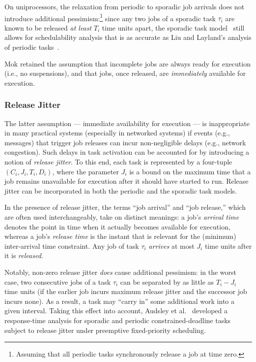 On uniprocessors, the relaxation from periodic to sporadic job arrivals does not introduce additional pessimism:\footnote{Assuming that all periodic tasks synchronously release a job at time zero.} since any two jobs of a sporadic task $\tau_i$ are  known to be released \emph{at least} $T_i$ time units apart, the sporadic task model~\cite{Mo:83} still allows for schedulability analysis that is as accurate as Liu and Layland's analysis of periodic tasks~\cite{LL:73}. 

Mok retained the assumption that incomplete jobs are always ready for execution (i.e., no suspensions), and that jobs, once released, are \emph{immediately} available for execution. 


\subsubsection{Release Jitter}
\label{sec:jitter}

The latter assumption --- immediate availability for execution --- is inappropriate in many practical systems (especially in networked systems) if events (e.g., messages) that trigger job releases can incur non-negligible delays (e.g., network congestion). Such delays in task activation can be accounted for by introducing a notion of \emph{release jitter}. To this end, each task is represented by a four-tuple $(C_i, J_i, T_i, D_i)$, where the parameter $J_i$ is a bound on the maximum time that a job remains unavailable for execution after it should have started to run. Release jitter can be incorporated in both the periodic and the sporadic task models.

In the presence of release jitter, the terms ``job arrival'' and ``job release,'' which are often used interchangeably, take on distinct meanings: a job's \emph{arrival time} denotes the point in time when it actually becomes available for execution, whereas a job's \emph{release time} is the instant that is relevant for the (minimum) inter-arrival time constraint. Any job of task $\tau_i$  \emph{arrives} at most $J_i$ time units after it is \emph{released}.

Notably, non-zero release jitter \emph{does} cause additional pessimism: in the worst case, two consecutive jobs of a task $\tau_i$ can be separated by as little as $T_i - J_i$ time units (if the earlier job incurs maximum release jitter and the successor job incurs none). As a result, a task may ``carry in'' some additional work into a given interval. Taking this effect into account, Audsley et al.~\cite{ABRTW:93} developed a response-time analysis for sporadic and periodic constrained-deadline tasks subject to release jitter under preemptive fixed-priority scheduling.

